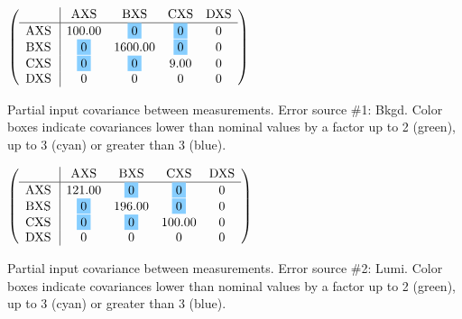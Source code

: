 \begin{table}[H]
\scriptsize
\begin{center}
\renewcommand{\arraystretch}{1.1}
\begin{math}\left(\begin{array}{c|cccc}
 & \mathrm{AXS} & 
\mathrm{BXS} & 
\mathrm{CXS} & 
\mathrm{DXS} \\
\hline
\mathrm{AXS} \hspace*{2pt} &     100.00 &  \colorbox{SkyBlue1}{$ 0$} &  \colorbox{SkyBlue1}{$ 0$} &  0 \\
\mathrm{BXS} \hspace*{2pt} &  \colorbox{SkyBlue1}{$ 0$} &    1600.00 &  \colorbox{SkyBlue1}{$ 0$} &  0 \\
\mathrm{CXS} \hspace*{2pt} &  \colorbox{SkyBlue1}{$ 0$} &  \colorbox{SkyBlue1}{$ 0$} &       9.00 &  0 \\
\mathrm{DXS} \hspace*{2pt} &  0 &  0 &  0 &  0 \\
\end{array}\right)\end{math}
\caption{Partial input covariance between measurements. Error source \#1: Bkgd. Color boxes indicate covariances lower than nominal values by a factor up to 2 (green), up to 3 (cyan) or greater than 3 (blue).}
\renewcommand{\arraystretch}{1}
\end{center}
\end{table}
\begin{table}[H]
\scriptsize
\begin{center}
\renewcommand{\arraystretch}{1.1}
\begin{math}\left(\begin{array}{c|cccc}
 & \mathrm{AXS} & 
\mathrm{BXS} & 
\mathrm{CXS} & 
\mathrm{DXS} \\
\hline
\mathrm{AXS} \hspace*{2pt} &     121.00 &  \colorbox{SkyBlue1}{$ 0$} &  \colorbox{SkyBlue1}{$ 0$} &  0 \\
\mathrm{BXS} \hspace*{2pt} &  \colorbox{SkyBlue1}{$ 0$} &     196.00 &  \colorbox{SkyBlue1}{$ 0$} &  0 \\
\mathrm{CXS} \hspace*{2pt} &  \colorbox{SkyBlue1}{$ 0$} &  \colorbox{SkyBlue1}{$ 0$} &     100.00 &  0 \\
\mathrm{DXS} \hspace*{2pt} &  0 &  0 &  0 &  0 \\
\end{array}\right)\end{math}
\caption{Partial input covariance between measurements. Error source \#2: Lumi. Color boxes indicate covariances lower than nominal values by a factor up to 2 (green), up to 3 (cyan) or greater than 3 (blue).}
\renewcommand{\arraystretch}{1}
\end{center}
\end{table}
